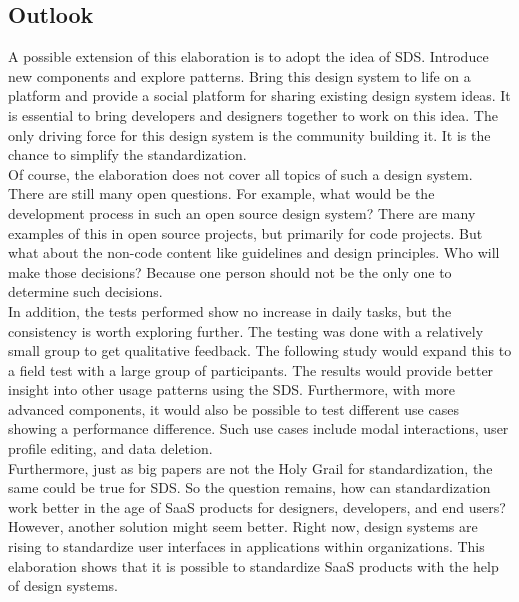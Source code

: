 \subsection{Outlook}
A possible extension of this elaboration is to adopt the idea of \ac{SDS}. Introduce new components and explore patterns. Bring this design system to life on a platform and provide a social platform for sharing existing design system ideas. It is essential to bring developers and designers together to work on this idea. The only driving force for this design system is the community building it. It is the chance to simplify the standardization. \\
Of course, the elaboration does not cover all topics of such a design system. There are still many open questions. For example, what would be the development process in such an open source design system? There are many examples of this in open source projects, but primarily for code projects. But what about the non-code content like guidelines and design principles. Who will make those decisions? Because one person should not be the only one to determine such decisions. \\
In addition, the tests performed show no increase in daily tasks, but the consistency is worth exploring further. The testing was done with a relatively small group to get qualitative feedback. The following study would expand this to a field test with a large group of participants. The results would provide better insight into other usage patterns using the \ac{SDS}. Furthermore, with more advanced components, it would also be possible to test different use cases showing a performance difference. Such use cases include modal interactions, user profile editing, and data deletion. \\
Furthermore, just as big papers are not the Holy Grail for standardization, the same could be true for \ac{SDS}. So the question remains, how can standardization work better in the age of \ac{SaaS} products for designers, developers, and end users? However, another solution might seem better. Right now, design systems are rising to standardize user interfaces in applications within organizations. This elaboration shows that it is possible to standardize \ac{SaaS} products with the help of design systems. 